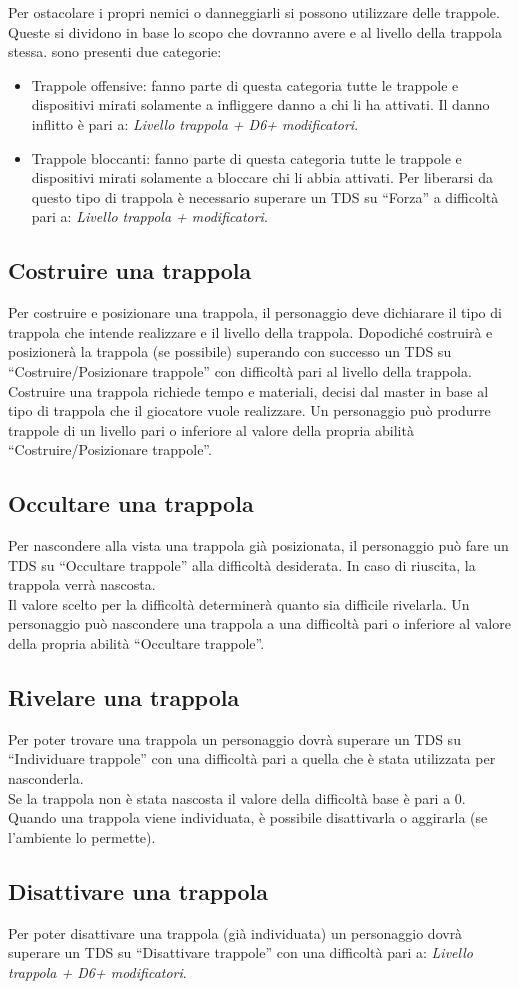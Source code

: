 \documentclass[../manuale_main.tex]{subfiles}
\begin{document}
Per ostacolare i propri nemici o danneggiarli si possono utilizzare delle trappole.
Queste si dividono in base lo scopo che dovranno avere e al livello della trappola stessa.
sono presenti due categorie:
\begin{itemize}
\item Trappole offensive: fanno parte di questa categoria tutte le trappole e dispositivi mirati solamente a infliggere danno a chi li ha attivati. Il danno inflitto è pari a: \textit{Livello trappola + D6+ modificatori}.
\item Trappole bloccanti: fanno parte di questa categoria tutte le trappole e dispositivi mirati solamente a bloccare chi li abbia attivati. Per liberarsi da questo tipo di trappola è necessario superare un TDS su ``Forza'' a difficoltà pari a: \textit{Livello trappola + modificatori}.
\end{itemize}

\subsection{Costruire una trappola}
Per costruire e posizionare una trappola, il personaggio deve dichiarare il tipo di trappola che intende realizzare e il livello della trappola. Dopodiché costruirà e posizionerà la trappola (se possibile) superando con successo un TDS su ``Costruire/Posizionare trappole'' con difficoltà pari al livello della trappola.
Costruire una trappola richiede tempo e materiali, decisi dal master in base al tipo di trappola che il giocatore vuole realizzare.
Un personaggio può produrre trappole di un livello pari o inferiore al valore della propria abilità ``Costruire/Posizionare trappole”.

\subsection{Occultare una trappola}
Per nascondere alla vista una trappola già posizionata, il personaggio può fare un TDS su “Occultare trappole'' alla difficoltà desiderata. In caso di riuscita, la trappola verrà nascosta.\\
Il valore scelto per la difficoltà determinerà quanto sia difficile rivelarla.
Un personaggio può nascondere una trappola a una difficoltà pari o inferiore al valore della propria abilità ``Occultare trappole''.

\subsection{Rivelare una trappola}
Per poter trovare una trappola un personaggio dovrà superare un TDS su ``Individuare trappole'' con una difficoltà pari a quella che è stata utilizzata per nasconderla.\\
Se la trappola non è stata nascosta il valore della difficoltà base è pari a 0.\\
Quando una trappola viene individuata, è possibile disattivarla o aggirarla (se l’ambiente lo permette).

\subsection{Disattivare una trappola}
Per poter disattivare una trappola (già individuata) un personaggio dovrà superare un TDS su ``Disattivare trappole'' con una difficoltà pari a: \textit{Livello trappola + D6+ modificatori}.
\end{document}
